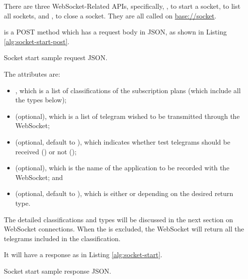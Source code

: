 There are three WebSocket-Related APIs, specifically, , to start a socket,  to list all sockets, and , to close a socket. They are all called on \url{base://socket}.

 is a POST method which has a request body in JSON, as shown in Listing \ref{alg:socket-start-post}.

\begin{listing}[!ht]
    \caption{Socket start sample request JSON.}
    \label{alg:socket-start-post}
\end{listing}

The attributes are:
\begin{itemize}
    \item {}, which is a list of classifications of the subscription plans (which include all the types below);
    \item {} (optional), which is a list of telegram wished to be transmitted through the WebSocket;
    \item {} (optional, default to ), which indicates whether test telegrams should be received () or not ();
    \item {} (optional), which is the name of the application to be recorded with the WebSocket; and
    \item {} (optional, default to ), which is either  or  depending on the desired return type.
\end{itemize}

The detailed classifications and types will be discussed in the next section on WebSocket connections. When the  is excluded, the WebSocket will return all the telegrams included in the classification.

It will have a response as in Listing \ref{alg:socket-start}.

\begin{listing}[!ht]
    \caption{Socket start sample response JSON.}
    \label{alg:socket-start}
\end{listing}

